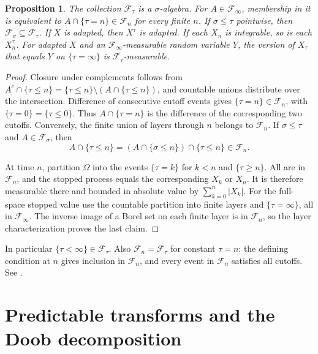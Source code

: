 \documentclass[11pt,oneside,openany]{book}
\theoremstyle{plain}
\newtheorem{proposition}[theorem]{Proposition}
\theoremstyle{definition}
\theoremstyle{remark}
\begin{document}
\begin{proposition}
The collection \(\mathcal F_\tau\) is a \(\sigma\)-algebra.
For \(A\in\mathcal F_\infty\), membership in it is equivalent
to \(A\cap\{\tau=n\}\in\mathcal F_n\) for every finite \(n\).
If \(\sigma\le\tau\) pointwise, then
\(\mathcal F_\sigma\subseteq\mathcal F_\tau\).
If \(X\) is adapted, then \(X^\tau\) is adapted. If each \(X_n\)
is integrable, so is each \(X^\tau_n\). For adapted \(X\) and an
\(\mathcal F_\infty\)-measurable random variable \(Y\), the version
of \(X_\tau\) that equals \(Y\) on \(\{\tau=\infty\}\) is
\(\mathcal F_\tau\)-measurable.
\end{proposition}
\begin{proof}
Closure under complements follows from
\(A^c\cap\{\tau\le n\}=\{\tau\le n\}\setminus
(A\cap\{\tau\le n\})\), and countable unions distribute over the
intersection. Difference of consecutive cutoff events gives
\(\{\tau=n\}\in\mathcal F_n\), with \(\{\tau=0\}=\{\tau\le0\}\).
Thus \(A\cap\{\tau=n\}\) is the difference of the corresponding
two cutoffs. Conversely, the finite union of layers through \(n\)
belongs to \(\mathcal F_n\). If \(\sigma\le\tau\) and
\(A\in\mathcal F_\sigma\), then
\[
 A\cap\{\tau\le n\}
   =(A\cap\{\sigma\le n\})\cap\{\tau\le n\}\in\mathcal F_n .
\]

At time \(n\), partition \(\Omega\) into the events \(\{\tau=k\}\)
for \(k<n\) and \(\{\tau\ge n\}\). All are in \(\mathcal F_n\),
and the stopped process equals the corresponding \(X_k\) or \(X_n\).
It is therefore measurable there and bounded in absolute value by
\(\sum_{k=0}^n |X_k|\). For the full-space stopped value use the
countable partition into finite layers and \(\{\tau=\infty\}\), all
in \(\mathcal F_\infty\). The inverse image of a Borel set on each
finite layer is in \(\mathcal F_n\), so the layer characterization
proves the last claim.
\end{proof}

In particular \(\{\tau<\infty\}\in\mathcal F_\tau\).
Also \(\mathcal F_{n}=\mathcal F_\tau\) for constant \(\tau=n\):
the defining condition at \(n\) gives inclusion in \(\mathcal F_n\),
and every event in \(\mathcal F_n\) satisfies all cutoffs.
See \cite[Section 10.9 and Appendix A14]{Williams}.

\section{Predictable transforms and the Doob decomposition}\label{p207:W03}
\end{document}
